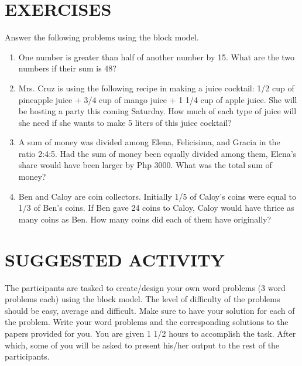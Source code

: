 \section*{EXERCISES}
Answer the following problems using the block model.
\begin{enumerate}
\item One number is greater than half of another number by 15. What are the two numbers if
their sum is 48?
\item Mrs. Cruz is using the following recipe in making a juice cocktail: 1/2 cup of pineapple juice $+$ 3/4
cup of mango juice $+$ 1 1/4 cup of apple juice. She will be hosting a party this coming
Saturday. How much of each type of juice will she need if she wants to make 5 liters of this
juice cocktail?
\item A sum of money was divided among Elena, Felicisima, and Gracia in the ratio 2:4:5. Had the
sum of money been equally divided among them, Elena's share would have been larger by
Php 3000. What was the total sum of money?
\item Ben and Caloy are coin collectors. Initially 1/5 of Caloy's coins were equal to 1/3 of Ben's
coins. If Ben gave 24 coins to Caloy, Caloy would have thrice as many coins as Ben. How
many coins did each of them have originally?
\end{enumerate}

\section*{SUGGESTED ACTIVITY}
The participants are tasked to create/design your own word problems (3 word problems
each) using the block model. The level of difficulty of the problems should be easy, average and
difficult. Make sure to have your solution for each of the problem. Write your word problems and
the corresponding solutions to the papers provided for you. You are given 1 1/2 hours to accomplish
the task. After which, some of you will be asked to present his/her output to the rest of the
participants.